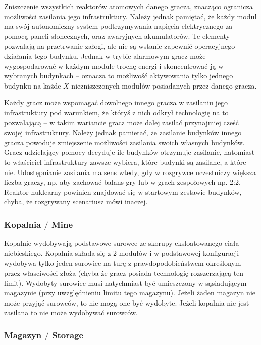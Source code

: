\documentclass[11pt,a4paper]{article}
\begin{document}
Zniszczenie wszystkich reaktorów atomowych danego gracza, znacząco ogranicza możliwości zasilania jego infrastruktury. Należy jednak pamiętać, że każdy moduł ma swój autonomiczny system podtrzymywania napięcia elektrycznego za pomocą paneli słonecznych, oraz awaryjnych akumulatorów. Te elementy pozwalają na przetrwanie załogi, ale nie są wstanie zapewnić operacyjnego działania tego budynku. Jednak w trybie alarmowym gracz może wygospodarować w każdym module trochę energi i skoncentrować ją w wybranych budynkach -- oznacza to możliwość aktywowania tylko jednego budynku na każde $X$ niezniszczonych modułów posiadanych przez danego gracza.

Każdy gracz może wspomagać dowolnego innego gracza w zasilaniu jego infrastruktury pod warunkiem, że któryś z nich odkrył technologię na to pozwalającą -- w takim wariancie gracz może dalej zasilać przynajmiej cześć swojej infrastruktury. Należy jednak pamietać, że zasilanie budynków innego gracza powoduje zmiejszenie możliwości zasilania swoich własnych budynków. Gracz udzielający pomocy decyduje ile budynków otrzymuje zasilanie, natomiast to właściciel infrastruktury zawsze wybiera, które budynki są zasilane, a które nie. Udostępnianie zasilania ma sens wtedy, gdy w rozgrywce uczestniczy większa liczba graczy, np. aby zachować balans gry lub w grach zespołowych np. 2:2. Reaktor nuklearny powinien znajdować się w startowym zestawie budynków, chyba, że rozgrywany scenariusz mówi inaczej.

\subsubsection{Kopalnia $/$ Mine }

Kopalnie wydobywają podstawowe surowce ze skorupy eksloatowanego ciała niebieskiego. Kopalnia składa się z 2 modułów i w podstawowej konfiguracji wydobywa tylko jeden surowiec na turę z prawdopodobieństwem określonym przez własciwości złoża (chyba że gracz posiada technologię rozszerzającą ten limit). Wydobyty surowiec musi natychmiast być umieszczony w sąsiadującym magazynie (przy uwzględnieniu limitu tego magazynu). Jeżeli żaden magazyn nie może przyjąć surowców, to nie mogą one być wydobyte. Jeżeli kopalnia nie jest zasilana to nie może wydobywać surowców.

\subsubsection{Magazyn $/$ Storage}
\end{document}
